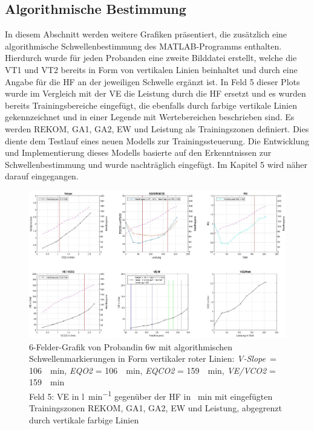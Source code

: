 \subsection{Algorithmische Bestimmung}
%
In diesem Abschnitt werden weitere Grafiken präsentiert, die zusätzlich eine algorithmische Schwellenbestimmung des MATLAB-Programms enthalten. Hierdurch wurde für jeden Probanden eine zweite Bilddatei erstellt, welche die VT1 und VT2 bereits in Form von vertikalen Linien beinhaltet und durch eine Angabe für die \gls{HF} an der jeweiligen Schwelle ergänzt ist. In Feld 5 dieser Plots wurde im Vergleich mit der \gls{VE} die Leistung durch die \gls{HF} ersetzt und es wurden bereits Trainingsbereiche eingefügt, die ebenfalls durch farbige vertikale Linien gekennzeichnet und in einer Legende mit Wertebereichen beschrieben sind. Es werden \gls{REKOM}, \gls{GA1}, \gls{GA2}, \gls{EW} und Leistung als Trainingszonen definiert. Dies diente dem Testlauf eines neuen Modells zur Trainingssteuerung. Die Entwicklung und Implementierung dieses Modells basierte auf den Erkenntnissen zur Schwellenbestimmung und wurde nachträglich eingefügt. Im Kapitel 5 wird näher darauf eingegangen.
%
\begin{figure}[H]
	\centering
	\noindent\includegraphics[angle=0,width=\linewidth,keepaspectratio]{Bilder/auto_6}
	\caption[6-Felder-Grafik von Probandin 6w mit algorithmischen Schwellenmarkierungen]{6-Felder-Grafik von Probandin 6w mit algorithmischen Schwellenmarkierungen in Form vertikaler roter Linien: \textsl{V-Slope}~= \SI{106}{\per\minute}, \textsl{\gls{EQO2}} = \SI{106}{\per\minute}, \textsl{\gls{EQCO2}} = \SI{159}{\per\minute}, \textsl{\gls{VE}/\gls{VCO2}} = \SI{159}{\per\minute}\\Feld 5: \gls{VE} in \si{\litre\per\minute} gegenüber der \gls{HF} in \si{\per\minute} mit eingefügten Trainingszonen \gls{REKOM}, \gls{GA1}, \gls{GA2}, \gls{EW} und Leistung, abgegrenzt durch vertikale farbige Linien}
	\label{pic:pic17}
\end{figure}
